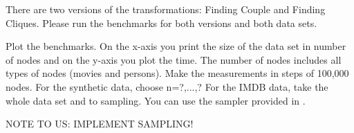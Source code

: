 \documentclass[a4paper]{article}
\begin{document}
There are two versions of the transformations: Finding Couple and Finding Cliques.
Please run the benchmarks for both versions and both data sets.


Plot the benchmarks. On the x-axis you print the size of the data set
in number of nodes and on the y-axis you plot the time. The number of nodes
includes all types of nodes (movies and persons). Make the measurements in
steps of 100,000 nodes. For the synthetic data, choose n=?,...,?
For the IMDB data, take the whole data set and to sampling. You can use
the sampler provided in \cite{IMDB2EMF}. 

NOTE TO US: IMPLEMENT SAMPLING!





\end{document}
